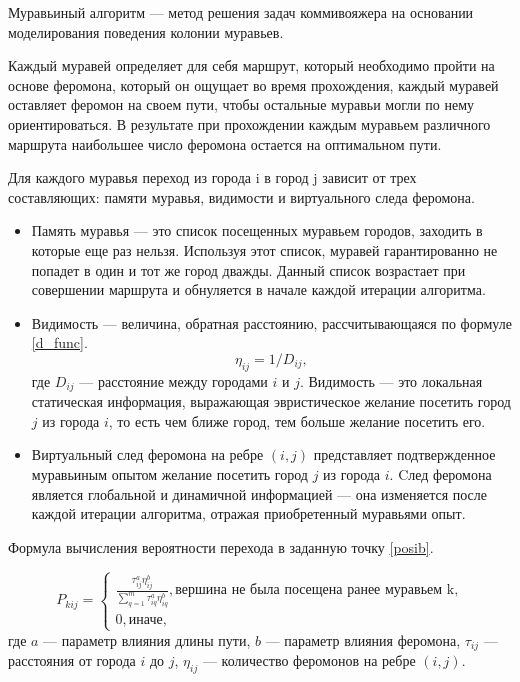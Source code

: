 \documentclass[a4paper,14pt, unknownkeysallowed]{extreport}
\begin{document}
Муравьиный алгоритм \cite{shtovba} --- метод решения задач коммивояжера на основании моделирования поведения колонии муравьев.

Каждый муравей определяет для себя маршрут, который необходимо пройти на основе феромона, который он ощущает во время прохождения, каждый муравей оставляет феромон на своем пути, чтобы остальные муравьи могли по нему ориентироваться. В результате при прохождении каждым муравьем различного маршрута наибольшее число феромона остается на оптимальном пути.


Для каждого муравья переход из города i в город j зависит от трех составляющих: памяти муравья, видимости и виртуального следа феромона.

\begin{itemize}
    \item Память муравья --- это список посещенных муравьем городов, заходить в которые еще раз нельзя.
    Используя этот список, муравей гарантированно не попадет в один и тот же город дважды. 
    Данный список возрастает при совершении маршрута и обнуляется в начале каждой итерации алгоритма.

    \item Видимость --- величина, обратная расстоянию, рассчитывающаяся по формуле \ref{d_func}.
        \begin{equation}
	   \label{d_func}
	   \eta_{ij} = 1 / D_{ij},
        \end{equation} 
        где $D_{ij}$ --- расстояние между городами $i$ и $j$. 
        Видимость --- это локальная статическая информация, выражающая эвристическое желание посетить город $j$ из города $i$, то есть чем ближе город, тем больше желание посетить его.

    \item Виртуальный след феромона на ребре $(i, j)$ представляет подтвержденное муравьиным опытом желание посетить город $j$ из города $i$. Cлед феромона является глобальной и динамичной информацией --- она изменяется после каждой итерации алгоритма, отражая приобретенный муравьями опыт.
\end{itemize}

Формула вычисления вероятности перехода в заданную точку \eqref{posib}.

\begin{equation}
	\label{posib}
	P_{kij} = \begin{cases}
		\frac{\tau_{ij}^a\eta_{ij}^b}{\sum_{q=1}^m \tau^a_{iq}\eta^b_{iq}}, \textrm{вершина не была посещена ранее муравьем k,} \\
		0, \textrm{иначе,}
	\end{cases}
\end{equation}
где $a$ --- параметр влияния длины пути, $b$ --- параметр влияния феромона, $\tau_{ij}$ --- расстояния от города $i$ до $j$, $\eta_{ij}$ --- количество феромонов на ребре $(i, j)$.
\end{document}
